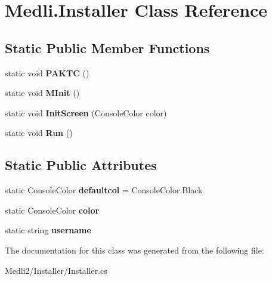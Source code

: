 \hypertarget{class_medli_1_1_installer}{}\section{Medli.\+Installer Class Reference}
\label{class_medli_1_1_installer}
\subsection*{Static Public Member Functions}
\begin{DoxyCompactItemize}
\item 
\mbox{\label{class_medli_1_1_installer_a408dc6e6c6cbd1de9f20bbf571b31576}} 
static void {\bfseries P\+A\+K\+TC} ()
\item 
\mbox{\label{class_medli_1_1_installer_ad06c2ba62c1a31c91a06b617b40e1fb0}} 
static void {\bfseries M\+Init} ()
\item 
\mbox{\label{class_medli_1_1_installer_a3a93a8bcda11cc6ba2b478fc1ae14c73}} 
static void {\bfseries Init\+Screen} (Console\+Color color)
\item 
\mbox{\label{class_medli_1_1_installer_af7e07d0e38c695b5a8dcb6ae749b2be9}} 
static void {\bfseries Run} ()
\end{DoxyCompactItemize}
\subsection*{Static Public Attributes}
\begin{DoxyCompactItemize}
\item 
\mbox{\label{class_medli_1_1_installer_a9116d1bdf2e2ce27269149a3a6fc1dd6}} 
static Console\+Color {\bfseries defaultcol} = Console\+Color.\+Black
\item 
\mbox{\label{class_medli_1_1_installer_ab659ae34a527b1a6b6d45f44a71776d0}} 
static Console\+Color {\bfseries color}
\item 
\mbox{\label{class_medli_1_1_installer_a712922622b63f92e0dcd3096594ccd13}} 
static string {\bfseries username}
\end{DoxyCompactItemize}


The documentation for this class was generated from the following file\+:\begin{DoxyCompactItemize}
\item 
Medli2/\+Installer/Installer.\+cs\end{DoxyCompactItemize}
